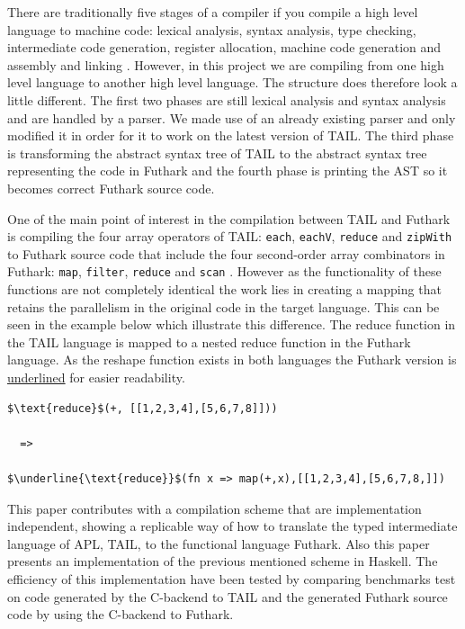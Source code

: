 \documentclass[11pt]{article}
\begin{document}
There are traditionally five stages of a compiler if you compile a high level language to machine code: 
lexical analysis, syntax analysis, type checking, intermediate code generation, register allocation, machine 
code generation and assembly and linking \cite{TorbenMogensen}. However, in this project we are compiling from 
one high level language to another high level language. The structure does therefore look a little different. 
The first two phases are still lexical analysis and syntax analysis and are handled by a parser.
We made use of an already existing parser \cite{APLACC} and only modified it in order for it to work on the latest 
version of TAIL. The third phase is transforming the abstract syntax tree of TAIL to the abstract syntax tree 
representing the code in Futhark and the fourth phase is printing the AST so it becomes correct 
Futhark source code. 

One of the main point of interest in the compilation between TAIL and Futhark is compiling the four array operators 
of TAIL: {\tt each}, {\tt eachV}, 
 {\tt reduce} and {\tt zipWith} to Futhark source code that include the four second-order array combinators in Futhark:  
 {\tt map}, {\tt filter}, {\tt reduce} and {\tt scan} \cite{ElsmanDybdal:Array:2014}\cite{TroelsHenriksen}. 
However as the functionality of these functions are not completely 
identical the work lies in creating a mapping that retains the parallelism in the original code in the target language.
This can be seen in the example below which illustrate this difference. The reduce function in the
TAIL language is mapped to a nested reduce function in the Futhark language.
As the reshape function exists in both languages the Futhark version is \underline{underlined} for easier readability.

\begin{lstlisting}[numbers=none,frame=none]
$\text{reduce}$(+, [[1,2,3,4],[5,6,7,8]]))

  =>

$\underline{\text{reduce}}$(fn x => map(+,x),[[1,2,3,4],[5,6,7,8,]])

\end{lstlisting}

This paper contributes with a compilation scheme that are implementation independent, showing a replicable 
way of how to translate the typed intermediate language of APL, TAIL, to the functional language Futhark. Also 
this paper presents an implementation of the previous mentioned scheme in Haskell. The efficiency of this
 implementation have been tested by comparing benchmarks test on code generated by the C-backend to TAIL 
 and the generated Futhark source code by using the C-backend to Futhark. \\
\end{document}
